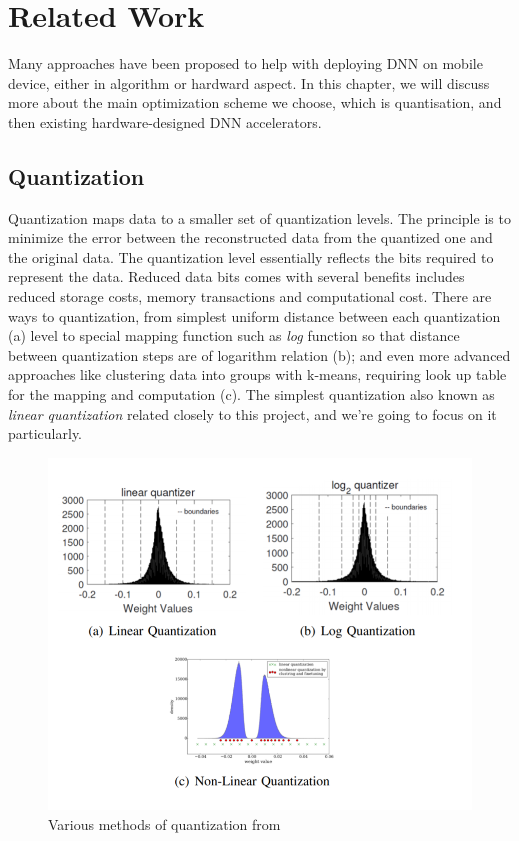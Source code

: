 \chapter{Related Work}
\label{ch:related_work}
Many approaches have been proposed to help with deploying DNN on mobile device, either in algorithm or hardward aspect. In this chapter, we will discuss more about the main optimization scheme we choose, which is quantisation, and then existing hardware-designed DNN accelerators.
\section{Quantization}
Quantization maps data to a smaller set of quantization levels. The principle is to minimize the error between the reconstructed data from the quantized one and the original data. The quantization level essentially reflects the bits required to represent the data. Reduced data bits comes with several benefits includes reduced storage costs, memory transactions and computational cost. There are ways to quantization, from simplest uniform distance between each quantization (a) level to special mapping function such as \textit{log} function so that distance between quantization steps are of logarithm relation (b); and even more advanced approaches like clustering data into groups with k-means, requiring look up table for the mapping and computation (c). The simplest quantization also known as \textit{linear quantization} related closely to this project, and we're going to focus on it particularly.
\begin{figure}
    \centering
    \includegraphics[width=0.8\linewidth]{inc/2_related_work/figure/quantization_types.png}
    \caption{Various methods of quantization from \cite{lognet}\cite{DeepCompression}}
    \label{fig:quant_types}
\end{figure}
